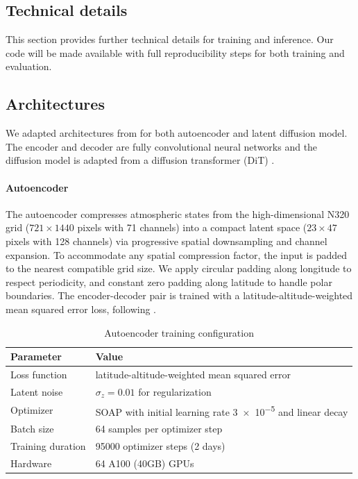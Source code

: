 \begin{subappendices}
\clearpage
\section{Technical details}

This section provides further technical details for training and inference. Our code will be made available with full reproducibility steps for both training and evaluation.

\subsection{Architectures}

We adapted architectures from \textcite{rozet2025lost} for both autoencoder and latent diffusion model. The encoder and decoder are fully convolutional neural networks and the diffusion model is adapted from a diffusion transformer (DiT) \cite{peebles2023scalable}.

\paragraph{Autoencoder}
The autoencoder compresses atmospheric states from the high-dimensional N320 grid ($721\times1440$ pixels with 71 channels) into a compact latent space ($23\times47$ pixels with 128 channels) via progressive spatial downsampling and channel expansion. To accommodate any spatial compression factor, the input is padded to the nearest compatible grid size. We apply circular padding along longitude to respect periodicity, and constant zero padding along latitude to handle polar boundaries. The encoder-decoder pair is trained with a latitude-altitude-weighted mean squared error loss, following \textcite{lam2023learning}.

\begin{table}[!h]
    \centering
    \caption{Autoencoder training configuration}
    \begin{tabular}{ll}
        \toprule
        \textbf{Parameter} & \textbf{Value} \\
        \midrule
        Loss function & latitude-altitude-weighted mean squared error \\
        Latent noise & $\sigma_z = 0.01$ for regularization \\
        Optimizer & SOAP \cite{vyas2025soap} with initial learning rate \num{3e-5} and linear decay\\
        Batch size & 64 samples per optimizer step \\
        Training duration & 95000 optimizer steps (2 days) \\
        Hardware & 64 A100 (40GB) GPUs \\
        \bottomrule
    \end{tabular}
    \label{tab:training-details}
\end{table}


\end{subappendices}
